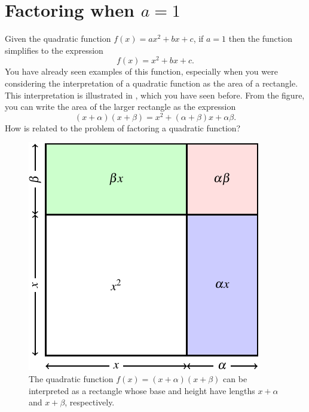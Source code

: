\documentclass[a4paper,oneside,12pt]{article}
\begin{document}
\section{Factoring when $a = 1$}
\label{sec:factor_quadratic_a_1}

Given the quadratic function $f(x) = ax^2 + bx + c$, if $a = 1$ then
the function simplifies to the expression
\begin{equation}
\label{eqn:monic_quadratic_function}
f(x)
=
x^2 + bx + c.
\end{equation}
You have already seen examples of this function, especially when you
were considering the interpretation of a quadratic function as the
area of a rectangle.  This interpretation is illustrated in
, which you have seen before.  From
the figure, you can write the area of the larger rectangle as the
expression
\begin{equation}
\label{eqn:monic_quadratic_function_factored}
(x + \alpha) (x + \beta)
=
x^2 + (\alpha + \beta)x + \alpha\beta.
\end{equation}
How is  related to
the problem of factoring a quadratic function?

\begin{figure}[!htbp]
\centering
\includegraphics[scale=1.1]{image/08/quadratic-as-square.pdf}
\caption{%
  The quadratic function $f(x) = (x + \alpha)(x + \beta)$ can be
  interpreted as a rectangle whose base and height have lengths
  $x + \alpha$ and $x + \beta$, respectively.
}
\label{fig:quadratic_as_rectangle}
\end{figure}
\end{document}
